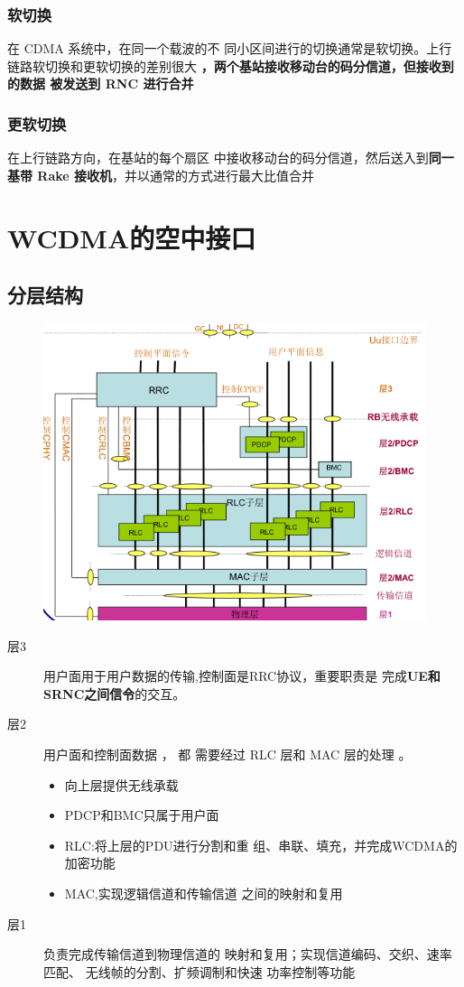 \subsubsection{软切换}
在 CDMA 系统中，在同一个载波的不
同小区间进行的切换通常是软切换。上行链路软切换和更软切换的差别很大
\textbf{，两个基站接收移动台的码分信道，但接收到的数据
被发送到 RNC 进行合并}
\subsubsection{更软切换}
在上行链路方向，在基站的每个扇区
中接收移动台的码分信道，然后送入到\textbf{同一基带 Rake
接收机}，并以通常的方式进行最大比值合并


\section{WCDMA的空中接口}
\subsection{分层结构}
\begin{figure}[H]
	\centering
	\includegraphics[width=0.7\linewidth]{figures/screenshot0019}
	\caption{}
	\label{fig:screenshot0019}
\end{figure}

\begin{description}
	\item[层3] 用户面用于用户数据的传输,控制面是RRC协议，重要职责是
	完成\textbf{UE和SRNC之间信令}的交互。
	\item[层2] 用户面和控制面数据 ， 都
	需要经过 RLC 层和 MAC 层的处理 。
	\begin{itemize}
		\item 向上层提供无线承载
		\item PDCP和BMC只属于用户面
		\item RLC:将上层的PDU进行分割和重
		组、串联、填充，并完成WCDMA的
		加密功能
		\item MAC,实现逻辑信道和传输信道
		之间的映射和复用
	\end{itemize}
	\item[层1] 负责完成传输信道到物理信道的
	映射和复用；实现信道编码、交织、速率匹配、
	无线帧的分割、扩频调制和快速
	功率控制等功能
\end{description}
